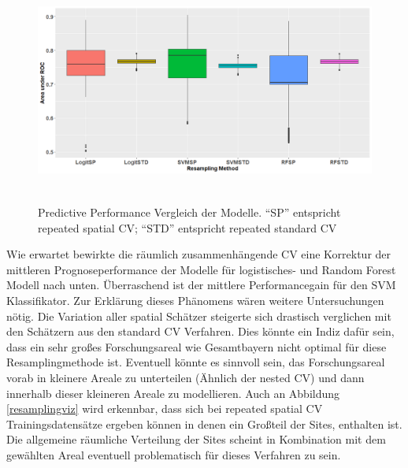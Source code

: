 \begin{figure}[H]
    \centering
    \includegraphics[width = 15cm, height = 7.5cm]{Figures/resamplingcomparison.png}
    \caption{Predictive Performance Vergleich der Modelle. ``SP'' entspricht repeated spatial CV; ``STD'' entspricht repeated standard CV}
    \label{performanceviz}
\end{figure}

Wie erwartet bewirkte die räumlich zusammenhängende CV eine Korrektur der mittleren Prognoseperformance der Modelle für logistisches- und Random Forest Modell nach unten. Überraschend ist der mittlere Performancegain für den SVM Klassifikator. Zur Erklärung dieses Phänomens wären weitere Untersuchungen nötig. Die Variation aller spatial Schätzer steigerte sich drastisch verglichen mit den Schätzern aus den standard CV Verfahren. Dies könnte ein Indiz dafür sein, dass ein sehr großes Forschungsareal wie Gesamtbayern nicht optimal für diese Resamplingmethode ist. Eventuell könnte es sinnvoll sein, das Forschungsareal vorab in kleinere Areale zu unterteilen (Ähnlich der nested CV) und dann innerhalb dieser kleineren Areale zu modellieren. Auch an Abbildung \ref{resamplingviz} wird erkennbar, dass sich bei repeated spatial CV Trainingsdatensätze ergeben können in denen ein Großteil der Sites, enthalten ist. Die allgemeine räumliche Verteilung der Sites scheint in Kombination mit dem gewählten Areal eventuell problematisch für dieses Verfahren zu sein. 